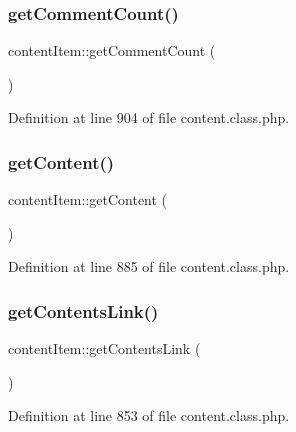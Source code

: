 \mbox{\label{classcontentItem_ae2402a7138ef2a2c9dae2d76aa31228f}} 
\subsubsection{\texorpdfstring{get\+Comment\+Count()}{getCommentCount()}}
{\footnotesize\ttfamily content\+Item\+::get\+Comment\+Count (\begin{DoxyParamCaption}{ }\end{DoxyParamCaption})}



Definition at line 904 of file content.\+class.\+php.

\mbox{\label{classcontentItem_adb35fd4206e162bccd6ff9f5ac832e09}} 
\subsubsection{\texorpdfstring{get\+Content()}{getContent()}}
{\footnotesize\ttfamily content\+Item\+::get\+Content (\begin{DoxyParamCaption}{ }\end{DoxyParamCaption})}



Definition at line 885 of file content.\+class.\+php.

\mbox{\label{classcontentItem_a80a161de842f1a890fdbfee439674881}} 
\subsubsection{\texorpdfstring{get\+Contents\+Link()}{getContentsLink()}}
{\footnotesize\ttfamily content\+Item\+::get\+Contents\+Link (\begin{DoxyParamCaption}{ }\end{DoxyParamCaption})}



Definition at line 853 of file content.\+class.\+php.

